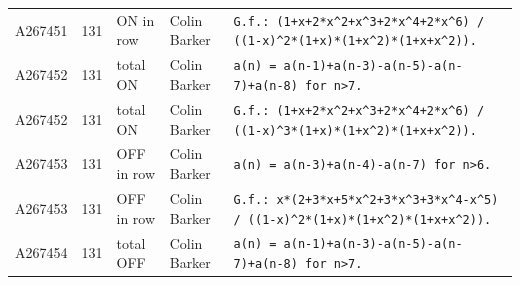 \documentclass[11pt]{article}
\theoremstyle{definition}
\theoremstyle{remark}
\begin{document}
{\begin{longtable}{p{1.3cm}p{0.7cm}p{2.4cm}p{2.3cm}p{7.3cm}}
A267451 & 131 & ON in row & Colin Barker & \texttt{G.f.: \allowbreak{}(1+\allowbreak{}x+\allowbreak{}2*\allowbreak{}x\^{}2+\allowbreak{}x\^{}3+\allowbreak{}2*\allowbreak{}x\^{}4+\allowbreak{}2*\allowbreak{}x\^{}6)\allowbreak{} \allowbreak{}/\allowbreak{} \allowbreak{}((1-\allowbreak{}x)\allowbreak{}\^{}2*\allowbreak{}(1+\allowbreak{}x)\allowbreak{}*\allowbreak{}(1+\allowbreak{}x\^{}2)\allowbreak{}*\allowbreak{}(1+\allowbreak{}x+\allowbreak{}x\^{}2)\allowbreak{})\allowbreak{}.} \\
A267452 & 131 & total ON & Colin Barker & \texttt{a(n)\allowbreak{} \allowbreak{}=\allowbreak{} \allowbreak{}a(n-\allowbreak{}1)\allowbreak{}+\allowbreak{}a(n-\allowbreak{}3)\allowbreak{}-\allowbreak{}a(n-\allowbreak{}5)\allowbreak{}-\allowbreak{}a(n-\allowbreak{}7)\allowbreak{}+\allowbreak{}a(n-\allowbreak{}8)\allowbreak{} \allowbreak{}for \allowbreak{}n>7.} \\
A267452 & 131 & total ON & Colin Barker & \texttt{G.f.: \allowbreak{}(1+\allowbreak{}x+\allowbreak{}2*\allowbreak{}x\^{}2+\allowbreak{}x\^{}3+\allowbreak{}2*\allowbreak{}x\^{}4+\allowbreak{}2*\allowbreak{}x\^{}6)\allowbreak{} \allowbreak{}/\allowbreak{} \allowbreak{}((1-\allowbreak{}x)\allowbreak{}\^{}3*\allowbreak{}(1+\allowbreak{}x)\allowbreak{}*\allowbreak{}(1+\allowbreak{}x\^{}2)\allowbreak{}*\allowbreak{}(1+\allowbreak{}x+\allowbreak{}x\^{}2)\allowbreak{})\allowbreak{}.} \\
A267453 & 131 & OFF in row & Colin Barker & \texttt{a(n)\allowbreak{} \allowbreak{}=\allowbreak{} \allowbreak{}a(n-\allowbreak{}3)\allowbreak{}+\allowbreak{}a(n-\allowbreak{}4)\allowbreak{}-\allowbreak{}a(n-\allowbreak{}7)\allowbreak{} \allowbreak{}for \allowbreak{}n>6.} \\
A267453 & 131 & OFF in row & Colin Barker & \texttt{G.f.: \allowbreak{}x*\allowbreak{}(2+\allowbreak{}3*\allowbreak{}x+\allowbreak{}5*\allowbreak{}x\^{}2+\allowbreak{}3*\allowbreak{}x\^{}3+\allowbreak{}3*\allowbreak{}x\^{}4-\allowbreak{}x\^{}5)\allowbreak{} \allowbreak{}/\allowbreak{} \allowbreak{}((1-\allowbreak{}x)\allowbreak{}\^{}2*\allowbreak{}(1+\allowbreak{}x)\allowbreak{}*\allowbreak{}(1+\allowbreak{}x\^{}2)\allowbreak{}*\allowbreak{}(1+\allowbreak{}x+\allowbreak{}x\^{}2)\allowbreak{})\allowbreak{}.} \\
A267454 & 131 & total OFF & Colin Barker & \texttt{a(n)\allowbreak{} \allowbreak{}=\allowbreak{} \allowbreak{}a(n-\allowbreak{}1)\allowbreak{}+\allowbreak{}a(n-\allowbreak{}3)\allowbreak{}-\allowbreak{}a(n-\allowbreak{}5)\allowbreak{}-\allowbreak{}a(n-\allowbreak{}7)\allowbreak{}+\allowbreak{}a(n-\allowbreak{}8)\allowbreak{} \allowbreak{}for \allowbreak{}n>7.} \\

\end{longtable}}
\end{document}
